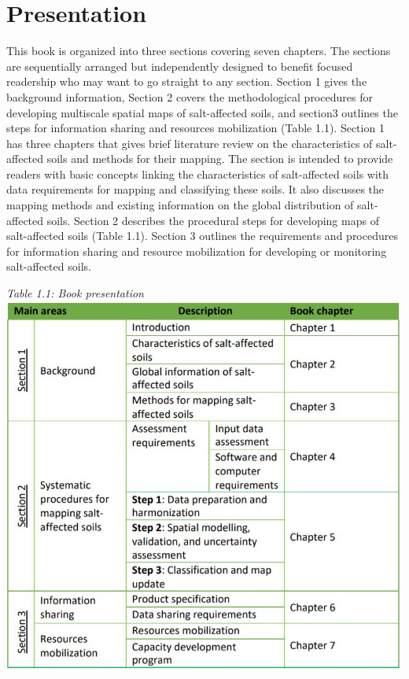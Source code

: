 \documentclass[
  10pt,
  b5paper,
]{book}
\begin{document}
\hypertarget{presentation}{%
\section{Presentation}\label{presentation}}

This book is organized into three sections covering seven chapters. The sections are sequentially arranged but independently designed to benefit focused readership who may want to go straight to any section. Section 1 gives the background information, Section 2 covers the methodological procedures for developing multiscale spatial maps of salt-affected soils, and section3 outlines the steps for information sharing and resources mobilization (Table 1.1). Section 1 has three chapters that gives brief literature review on the characteristics of salt-affected soils and methods for their mapping. The section is intended to provide readers with basic concepts linking the characteristics of salt-affected soils with data requirements for mapping and classifying these soils. It also discusses the mapping methods and existing information on the global distribution of salt-affected soils. Section 2 describes the procedural steps for developing maps of salt-affected soils (Table 1.1). Section 3 outlines the requirements and procedures for information sharing and resource mobilization for developing or monitoring salt-affected soils.

\emph{Table 1.1: Book presentation}
\includegraphics{figures/tables/Table_1.1.jpg}
\end{document}
